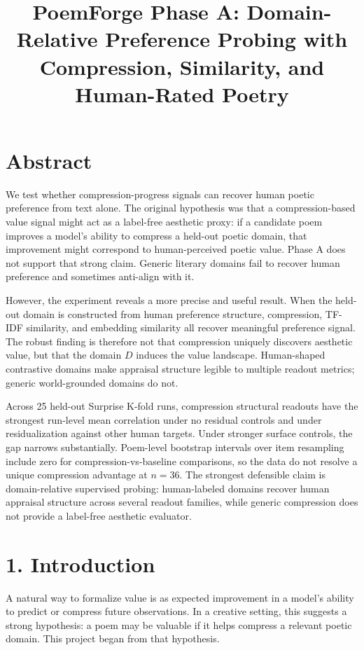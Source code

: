 \documentclass[11pt]{article}
\title{PoemForge Phase A: Domain-Relative Preference Probing with Compression, Similarity, and Human-Rated Poetry}
\author{}
\date{}
\begin{document}
\maketitle


\section{Abstract}

We test whether compression-progress signals can recover human poetic preference from text alone. The original hypothesis was that a compression-based value signal might act as a label-free aesthetic proxy: if a candidate poem improves a model’s ability to compress a held-out poetic domain, that improvement might correspond to human-perceived poetic value. Phase A does not support that strong claim. Generic literary domains fail to recover human preference and sometimes anti-align with it.

However, the experiment reveals a more precise and useful result. When the held-out domain is constructed from human preference structure, compression, TF-IDF similarity, and embedding similarity all recover meaningful preference signal. The robust finding is therefore not that compression uniquely discovers aesthetic value, but that the domain \(D\) induces the value landscape. Human-shaped contrastive domains make appraisal structure legible to multiple readout metrics; generic world-grounded domains do not.

Across 25 held-out Surprise K-fold runs, compression structural readouts have the strongest run-level mean correlation under no residual controls and under residualization against other human targets. Under stronger surface controls, the gap narrows substantially. Poem-level bootstrap intervals over item resampling include zero for compression-vs-baseline comparisons, so the data do not resolve a unique compression advantage at \(n=36\). The strongest defensible claim is domain-relative supervised probing: human-labeled domains recover human appraisal structure across several readout families, while generic compression does not provide a label-free aesthetic evaluator.

\section{1. Introduction}

A natural way to formalize value is as expected improvement in a model’s ability to predict or compress future observations. In a creative setting, this suggests a strong hypothesis: a poem may be valuable if it helps compress a relevant poetic domain. This project began from that hypothesis.
\end{document}
